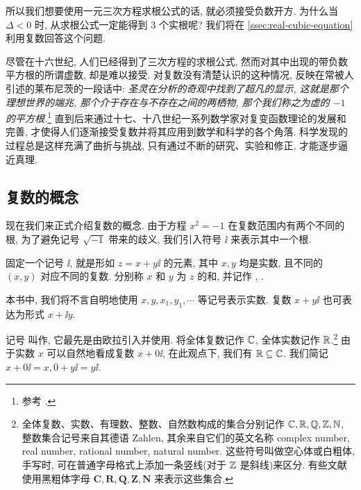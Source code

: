 所以我们想要使用一元三次方程求根公式的话, 就\alert{必须接受负数开方}.
为什么当 $\Delta<0$ 时, 从求根公式一定能得到 $3$ 个实根呢?
我们将在 \ref{ssec:real-cubic-equation}利用复数回答这个问题.

尽管在十六世纪, 人们已经得到了三次方程的求根公式, 然而对其中出现的带负数平方根的所谓虚数, 却是难以接受.
对复数没有清楚认识的这种情况, 反映在常被人引述的莱布尼茨的一段话中: \textcolor{third}{\itshape 圣灵在分析的奇观中找到了超凡的显示, 这就是那个理想世界的端兆, 那个介于存在与不存在之间的两栖物, 那个我们称之为虚的 $-1$ 的平方根.}\footnote{%
  参考 \cite[第13章2节]{Kline1990}.
}
直到后来通过十七、十八世纪一系列数学家对复变函数理论的发展和完善, 才使得人们逐渐接受复数并将其应用到数学和科学的各个角落.
科学发现的过程总是这样充满了曲折与挑战, 只有通过不断的研究、实验和修正, 才能逐步逼近真理.


\subsection{复数的概念}

现在我们来正式介绍复数的概念.
由于方程 $x^2=-1$ 在复数范围内有两个不同的根, 为了避免记号 $\sqrt{-1}$ 带来的歧义, 我们引入符号 $\ii$ 来表示其中一个根.

\begin{definition}
  固定一个记号 $\ii$, 就是形如 $z=x+y\ii$ 的元素, 其中 $x,y$ 均是实数, 且不同的 $(x,y)$ 对应不同的复数.
  分别称 $x$ 和 $y$ 为 $z$ 的和, 并记作 , .
\end{definition}

本书中, 我们将不言自明地使用 $x,y,x_1,y_1,\cdots$ 等记号表示实数.
复数 $x+y\ii$ 也可表达为形式 $x+\ii y$.

记号 \nouns{$\ii$} 叫作, 它最先是由欧拉引入并使用.
将\alert{全体复数记作 ${\mathbb{C}}$}, 全体实数记作 ${\mathbb{R}}$.\footnote{%
  全体复数、实数、有理数、整数、自然数构成的集合分别记作 ${\mathbb{C}},{\mathbb{R}},{\mathbb{Q}},{\mathbb{Z}},{\mathbb{N}}$, 整数集合记号来自其德语 Zahlen, 其余来自它们的英文名称 complex number, real number, rational number, natural number.
  这些符号叫做空心体或白粗体, 手写时, 可在普通字母格式上添加一条竖线(对于 ${\mathbb{Z}}$ 是斜线)来区分.
  有些文献使用黑粗体字母 $\mathbf{C,R,Q,Z,N}$ 来表示这些集合.
}
由于实数 $x$ 可以自然地看成复数 $x+0\ii$, 在此观点下, 我们有 ${\mathbb{R}}\subseteq {\mathbb{C}}$.
我们简记 $x+0\ii=x,0+y\ii=y\ii$.

